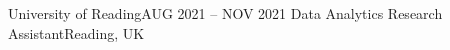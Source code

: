 \resumeSubheading
{University of Reading}{AUG 2021 -- NOV 2021}
{Data Analytics Research Assistant}{Reading, UK}
\resumeItemListStart
{}
\resumeItemListEnd
